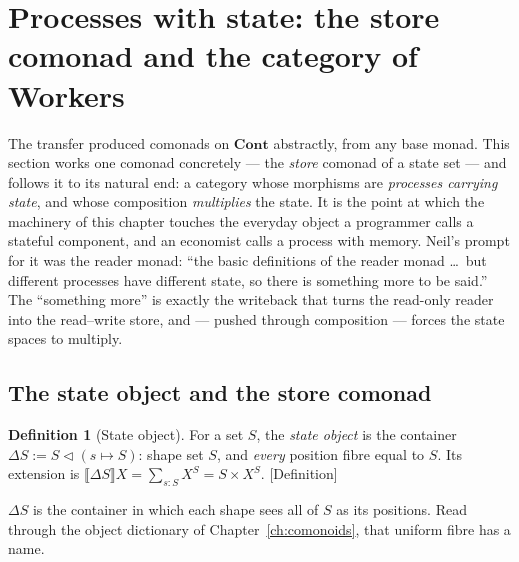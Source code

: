 \documentclass[11pt,a4paper]{book}
\newcommand{\Cont}{\mathbf{Cont}}
\newcommand{\cont}[2]{#1 \triangleleft #2}
\newcommand{\Ext}[1]{\llbracket #1 \rrbracket}
\theoremstyle{plain}
\theoremstyle{definition}
\newtheorem{Definition}[Theorem]{Definition}
\theoremstyle{remark}
\newcommand{\prov}[1]{\hfill\textsf{\footnotesize[#1]}}
\begin{document}
\section{Processes with state: the store comonad and the category of Workers}
\label{sec:moncomon-workers}

The transfer produced comonads on $\Cont$ abstractly, from any base monad. This section works one
comonad concretely --- the \emph{store} comonad of a state set --- and follows it to its natural end:
a category whose morphisms are \emph{processes carrying state}, and whose composition \emph{multiplies}
the state. It is the point at which the machinery of this chapter touches the everyday object a
programmer calls a stateful component, and an economist calls a process with memory. Neil's prompt for
it was the reader monad: ``the basic definitions of the reader monad \ldots\ but different processes
have different state, so there is something more to be said.'' The ``something more'' is exactly the
writeback that turns the read-only reader into the read--write store, and --- pushed through composition
--- forces the state spaces to multiply.

\subsection{The state object and the store comonad}
\label{sec:workers-store}

\begin{Definition}[State object]\label{def:state-object}
For a set $S$, the \emph{state object} is the container $\Delta S:=\cont S{(s\mapsto S)}$: shape set
$S$, and \emph{every} position fibre equal to $S$. Its extension is
$\Ext{\Delta S}X=\sum_{s:S}X^{S}=S\times X^{S}$.
\prov{Definition}
\end{Definition}

$\Delta S$ is the container in which each shape sees all of $S$ as its positions. Read through the
object dictionary of Chapter~\ref{ch:comonoids}, that uniform fibre has a name.
\end{document}
